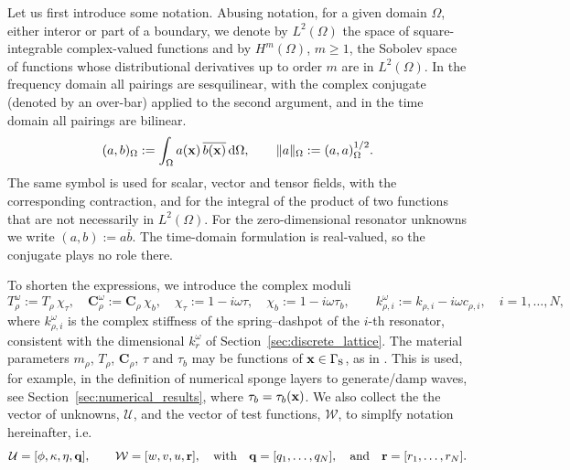 Let us first introduce some notation. Abusing notation, for a given domain $\Omega$, either interor or part of a boundary, we denote by $L^2(\Omega)$ the space of square-integrable complex-valued functions and by $H^m(\Omega)$, $m\geq1$, the Sobolev space of functions whose distributional derivatives up to order $m$ are in $L^2(\Omega)$. In the frequency domain all pairings are sesquilinear, with the complex conjugate (denoted by an over-bar) applied to the second argument, and in the time domain all pairings are bilinear.
\begin{equation}\label{eq:inner_product}
    (a,b)_\Omega := \int_\Omega a(\mathbf{x})\,\overline{b(\mathbf{x})}\,\mathrm{d}\Omega,
    \qquad \|a\|_\Omega := (a,a)_\Omega^{1/2}.
\end{equation}
The same symbol is used for scalar, vector and tensor fields, with the corresponding contraction, and for the integral of the product of two functions that are not necessarily in $L^2(\Omega)$. For the zero-dimensional resonator unknowns we write $(a,b):=a\overline{b}$. The time-domain formulation is real-valued, so the conjugate plays no role there.

To shorten the expressions, we introduce the complex moduli
\begin{equation}\label{eq:complex_moduli}
    T_\rho^\omega := T_\rho\,\chi_\tau,\quad
    \mathbf{C}_\rho^\omega := \mathbf{C}_\rho\,\chi_b,\quad
    \chi_\tau := 1-i\omega\tau,\quad
    \chi_b := 1-i\omega\tau_b,\qquad
    k_{\rho,i}^\omega := k_{\rho,i}-i\omega c_{\rho,i},\quad i=1,\ldots,N,
\end{equation}
where $k_{\rho,i}^\omega$ is the complex stiffness of the spring--dashpot of the $i$-th resonator, consistent with the dimensional $k_r^\omega$ of Section~\ref{sec:discrete_lattice}. The material parameters $m_\rho$, $T_\rho$, $\mathbf{C}_\rho$, $\tau$ and $\tau_b$ may be functions of $\mathbf{x}\in\Gamma_{\mbox{s}}$, as in \cite{el4911089optimization}. This is used, for example, in the definition of numerical sponge layers to generate/damp waves, see Section~\ref{sec:numerical_results}, where $\tau_b=\tau_b(\mathbf{x})$. We also collect the the vector of unknowns, $\mathcal{U}$, and the vector of test functions, $\mathcal{W}$, to simplfy notation hereinafter, i.e. 
\begin{equation*}
    \mathcal{U}=[\phi,\kappa,\eta,\mathbf{q}],\qquad \mathcal{W}=[w,v,u,\mathbf{r}],\quad \mbox{with}\quad\mathbf{q}=[q_1,\ldots,q_N],\quad\mbox{and}\quad \mathbf{r}=[r_1,\ldots,r_N].
\end{equation*}

